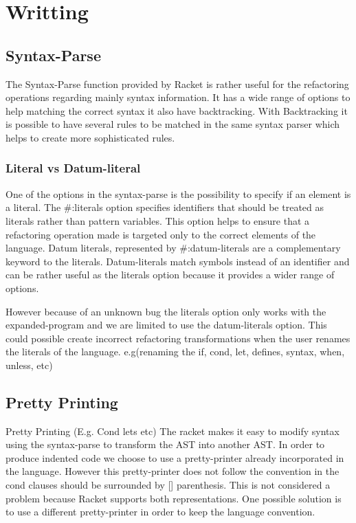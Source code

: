 \section{Writting}
\subsection{Syntax-Parse}

The Syntax-Parse function provided by Racket is rather useful for the refactoring
operations regarding mainly syntax information.
It has a wide range of options to help matching the correct syntax it also have  %
backtracking.
With Backtracking it is possible to have several rules to be matched
in the same syntax parser which helps to create more sophisticated rules.

\subsubsection{Literal vs Datum-literal}
One of the options in the syntax-parse is the possibility to specify if an element
is a literal.
The \#:literals option specifies identifiers that should be treated as literals
rather than pattern variables.
This option helps to ensure that a refactoring operation made is targeted only
to the correct elements of the language.
Datum literals, represented by \#:datum-literals are a complementary keyword to the
literals.
Datum-literals match symbols instead of an identifier and can be rather useful as
the literals option because it provides a wider range of options.

However because of an unknown bug the literals option only works with the expanded-program %
and we are limited to use the datum-literals option. This could possible create
incorrect refactoring transformations when the user renames the literals of the
language. e.g(renaming the if, cond, let, defines, syntax, when, unless, etc)

\subsection{Pretty Printing}

Pretty Printing (E.g. Cond lets etc)
The racket makes it easy to modify syntax using the syntax-parse to transform the
AST into another AST.
In order to produce indented code we choose to use a pretty-printer already
incorporated in the language.
However this pretty-printer does not follow the convention in the cond clauses
should be surrounded by [] parenthesis. This is not considered a problem because
Racket supports both representations.
One possible solution is to use a different pretty-printer in
order to keep the language convention.

